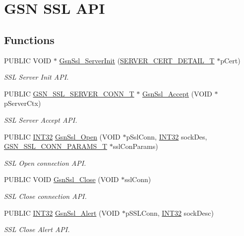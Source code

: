 \hypertarget{a00674}{
\section{GSN SSL API}
\label{a00674}
}
\subsection*{Functions}
\begin{DoxyCompactItemize}
\item 
PUBLIC VOID $\ast$ \hyperlink{a00674_ga006730269e57e14d7d8db08d92c6a66f}{GsnSsl\_\-ServerInit} (\hyperlink{a00459}{SERVER\_\-CERT\_\-DETAIL\_\-T} $\ast$pCert)
\begin{DoxyCompactList}\small\item\em SSL Server Init API. \end{DoxyCompactList}\item 
PUBLIC \hyperlink{a00245}{GSN\_\-SSL\_\-SERVER\_\-CONN\_\-T} $\ast$ \hyperlink{a00674_ga1a963b6c25ebc6d49fc74042b6a04fdc}{GsnSsl\_\-Accept} (VOID $\ast$pServerCtx)
\begin{DoxyCompactList}\small\item\em SSL Server Accept API. \end{DoxyCompactList}\item 
PUBLIC \hyperlink{a00660_ga63021d67d54286c2163bcdb43a6f2569}{INT32} \hyperlink{a00674_gae142357dbc08534b840fb7cb3a8ef918}{GsnSsl\_\-Open} (VOID $\ast$pSslConn, \hyperlink{a00660_ga63021d67d54286c2163bcdb43a6f2569}{INT32} sockDes, \hyperlink{a00242}{GSN\_\-SSL\_\-CONN\_\-PARAMS\_\-T} $\ast$sslConParams)
\begin{DoxyCompactList}\small\item\em SSL Open connection API. \end{DoxyCompactList}\item 
PUBLIC VOID \hyperlink{a00674_gadfc449eccdabf03e53cfad9ab4ec84a9}{GsnSsl\_\-Close} (VOID $\ast$sslConn)
\begin{DoxyCompactList}\small\item\em SSL Close connection API. \end{DoxyCompactList}\item 
PUBLIC \hyperlink{a00660_ga63021d67d54286c2163bcdb43a6f2569}{INT32} \hyperlink{a00674_ga6b68d0db3b129389d791294c46c0bdc8}{GsnSsl\_\-Alert} (VOID $\ast$pSSLConn, \hyperlink{a00660_ga63021d67d54286c2163bcdb43a6f2569}{INT32} sockDesc)
\begin{DoxyCompactList}\small\item\em SSL Close Alert API. \end{DoxyCompactList}\item 

\end{DoxyCompactItemize}
